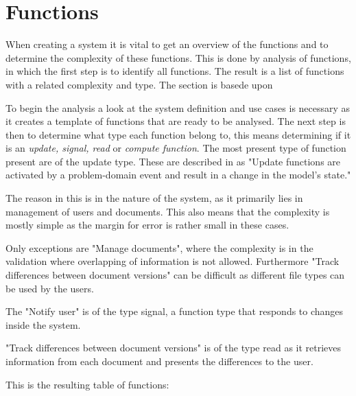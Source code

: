 \section{Functions}
When creating a system it is vital to get an overview of the functions and to determine the complexity of these functions. 
This is done by analysis of functions, in which the first step is to identify all functions. 
The result is a list of functions with a related complexity and type. 
The section is basede upon\citep[ch.~7]{Rod-Aalborg}

To begin the analysis a look at the system definition and use cases is necessary as it creates a template of functions that are ready to be analysed. 
The next step is then to determine what type each function belong to, this means determining if it is an \textit{update, signal, read} or \textit{compute function}.
The most present type of function present are of the update type. 
These are described in \citep[p.~140]{Rod-Aalborg}
as "Update functions are activated by a problem-domain event and result in a change in the model's state."\citep[p.~140]{Rod-Aalborg}


The reason in this is in the nature of the system, as it primarily lies in management of users and documents. 
This also means that the complexity is mostly simple as the margin for error is rather small in these cases. 

Only exceptions are "Manage documents", where the complexity is in the validation where overlapping of information is not allowed. 
Furthermore "Track differences between document versions" can be difficult as different file types can be used by the users.

The "Notify user" is of the type signal, a function type that responds to changes inside the system.

"Track differences between document versions" is of the type read as it retrieves information from each document and presents the differences to the user.

This is the resulting table of functions:

